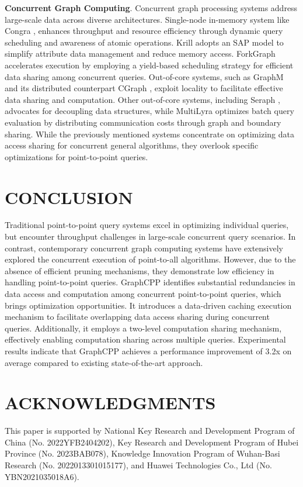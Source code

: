 \documentclass[10pt,journal,compsoc]{IEEEtran}
\begin{document}
{\bf{Concurrent Graph Computing}}. Concurrent graph processing systems address large-scale data across diverse architectures. Single-node in-memory system like Congra \cite{Congra}, enhances throughput and resource efficiency through dynamic query scheduling and awareness of atomic operations. Krill \cite{krill} adopts an SAP model to simplify attribute data management and reduce memory access. ForkGraph \cite{cache} accelerates execution by employing a yield-based scheduling strategy for efficient data sharing among concurrent queries. Out-of-core systems, such as GraphM \cite{graphm} and its distributed counterpart CGraph \cite{cgraph}, exploit locality to facilitate effective data sharing and computation.
Other out-of-core systems, including Seraph \cite{seraph}, advocates for decoupling data structures, while MultiLyra \cite{multilyra} optimizes batch query evaluation by distributing communication costs through graph and boundary sharing. While the previously mentioned systems concentrate on optimizing data access sharing for concurrent general algorithms, they overlook specific optimizations for point-to-point queries.

\section{CONCLUSION}\label{conclusion}
Traditional point-to-point query systems excel in optimizing individual queries, but encounter throughput challenges in large-scale concurrent query scenarios. In contrast, contemporary concurrent graph computing systems have extensively explored the concurrent execution of point-to-all algorithms. However, due to the absence of efficient pruning mechanisms, they demonstrate low efficiency in handling point-to-point queries. GraphCPP identifies substantial redundancies in data access and computation among concurrent point-to-point queries, which brings optimization opportunities. It introduces a data-driven caching execution mechanism to facilitate overlapping data access sharing during concurrent queries. Additionally, it employs a two-level computation sharing mechanism, effectively enabling computation sharing across multiple queries. Experimental results indicate that GraphCPP achieves a performance improvement of 3.2x on average compared to existing state-of-the-art approach.

\section{ACKNOWLEDGMENTS}\label{acknowledfments}
This paper is supported by National Key Research and Development Program of China (No. 2022YFB2404202), Key Research and Development Program of Hubei Province (No. 2023BAB078), Knowledge Innovation Program of Wuhan-Basi Research (No. 2022013301015177), and Huawei Technologies Co., Ltd (No. YBN2021035018A6).
\end{document}
